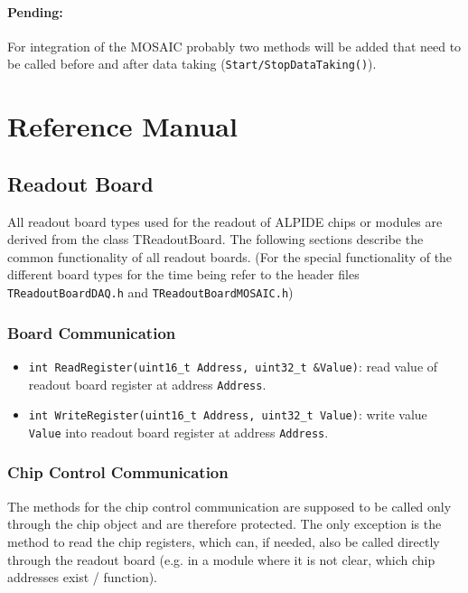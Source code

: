 \documentclass{article}
\let\oldsection\section
\renewcommand\section{\clearpage\oldsection}
\begin{document}
\paragraph{Pending:} For integration of the MOSAIC probably two
methods will be added that need to be called before and after data
taking (\texttt {Start/StopDataTaking()}). 




\section {Reference Manual}

\subsection{Readout Board}

All readout board types used for the readout of ALPIDE chips or modules are
derived from the class TReadoutBoard. The following sections describe
the common functionality of all readout boards. (For the special
functionality of the different board types for the time being refer to
the header files \texttt{TReadoutBoardDAQ.h} and \texttt{TReadoutBoardMOSAIC.h})


\subsubsection{Board Communication}

\begin{itemize}
\item \texttt{int ReadRegister(uint16\_t Address, uint32\_t \&Value)}:
  \newline read value of readout board register at address \texttt{Address}.
\item \texttt{int WriteRegister(uint16\_t Address, uint32\_t Value)}:
  \newline write value \texttt{Value} into readout board register at address
\texttt{Address}.
\end{itemize}



\subsubsection{Chip Control Communication}

The methods for the chip control communication are supposed to be
called only through the chip object and are therefore protected. The
only exception is the method to read the chip registers, which can, if
needed, also be called directly through the readout board (e.g. in a
module where it is not clear, which chip addresses exist / function). 
\end{document}
